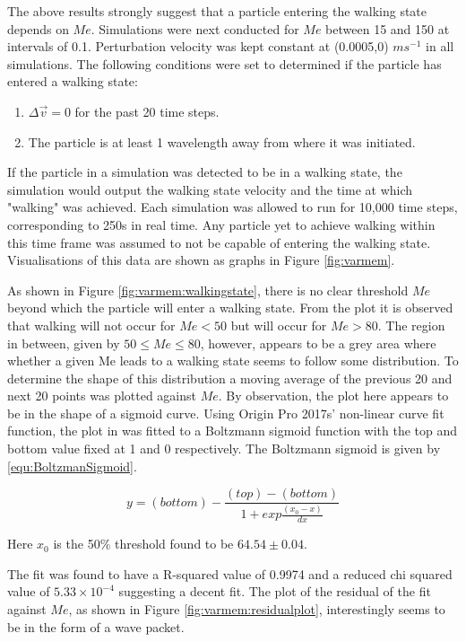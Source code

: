The above results strongly suggest that a particle entering the walking state depends on $Me$. Simulations were next conducted for $Me$ between 15 and 150 at intervals of 0.1. Perturbation velocity was kept constant at (0.0005,0) $ms^{-1}$ in all simulations. The following conditions were set to determined if the particle has entered a walking state:

\begin{enumerate}
    \item $\Delta\vec{v} = 0$ for the past 20 time steps.
    \item The particle is at least 1 wavelength away from where it was initiated.
\end{enumerate}

If the particle in a simulation was detected to be in a walking state, the simulation would output the walking state velocity and the time at which "walking" was achieved. Each simulation was allowed to run for 10,000 time steps, corresponding to 250s in real time. Any particle yet to achieve walking within this time frame was assumed to not be capable of entering the walking state. Visualisations of this data are shown as graphs in Figure \ref{fig:varmem}. 

As shown in Figure \ref{fig:varmem:walkingstate}, there is no clear threshold $Me$ beyond which the particle will enter a walking state. From the plot it is observed that walking will not occur for $Me < 50$ but will occur for $Me > 80$. The region in between, given by $50\leq Me\leq80$, however, appears to be a grey area where whether a given Me leads to a walking state seems to follow some distribution. To determine the shape of this distribution a moving average of the previous 20 and next 20 points was plotted against $Me$. By observation, the plot here appears to be in the shape of a sigmoid curve. Using Origin Pro 2017s' non-linear curve fit function, the plot in was fitted to a Boltzmann sigmoid function with the top and bottom value fixed at 1 and 0 respectively. The Boltzmann sigmoid is given by \ref{equ:BoltzmanSigmoid}.

\begin{equation}
y = (bottom) - \frac{(top)-(bottom)}{1+exp \frac{\left(x_0 - x \right)}{dx}}
\label{equ:BoltzmanSigmoid}
\end{equation}

Here $x_0$ is the 50\% threshold found to be $64.54\pm0.04$.

The fit was found to have a R-squared value of 0.9974 and a reduced chi squared value of $5.33 \times 10^{-4}$ suggesting a decent fit. The plot of the residual of the fit against $Me$, as shown in Figure \ref{fig:varmem:residualplot}, interestingly seems to be in the form of a wave packet. 

